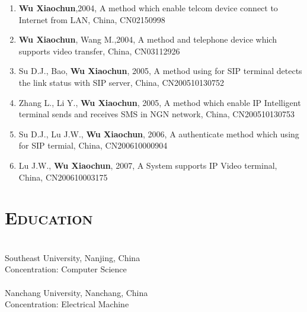 \documentclass[margin,11pt]{res}
\begin{document}
\begin{resume}
\begin{enumerate}
    \item \textbf{Wu Xiaochun},2004, A method which enable telcom device connect to Internet from LAN, China,  CN02150998
    \item \textbf{Wu Xiaochun}, Wang M.,2004, A method and telephone device which supports video transfer, China, CN03112926
    \item Su D.J., Bao, \textbf{Wu Xiaochun}, 2005, A method using for SIP terminal detects the link status
      with SIP server, China, CN200510130752
    \item Zhang L., Li Y., \textbf{Wu Xiaochun}, 2005, A method which enable IP Intelligent terminal sends
      and receives SMS in NGN network, China, CN200510130753
    \item Su D.J., Lu J.W., \textbf{Wu Xiaochun}, 2006, A authenticate method which using for SIP termial,
      China,  CN200610000904
    \item Lu J.W., \textbf{Wu Xiaochun}, 2007, A System supports IP Video terminal, China,
      CN200610003175
\end{enumerate}

\section{\textsc{Education}} 
                  \\
                Southeast University, Nanjing, China \\
                Concentration: Computer Science \\

                 \\
                Nanchang University, Nanchang, China \\
                Concentration: Electrical Machine \\
 
\end{resume}
\end{document}
